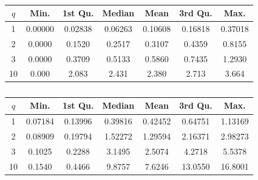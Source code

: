 \documentclass[preprint,5p,times,twocolumn,authoryear]{elsarticle}
\begin{document}



\begin{table}
	\caption{}
	\begin{tabular}{|ccccccc|}
    	$q$ & Min. & 1st Qu. & Median & Mean & 3rd Qu. & Max. \\\hline
        1 & 0.00000 & 0.02838 & 0.06263 & 0.10608 & 0.16818 & 0.37018 \\
        2 & 0.0000 & 0.1520 & 0.2517 & 0.3107 & 0.4359 & 0.8155 \\
        3 & 0.0000 & 0.3709 & 0.5133 & 0.5860 & 0.7435 & 1.2930 \\
        10 & 0.000 & 2.083 & 2.431 & 2.380 & 2.713 & 3.664 \\\hline
    \end{tabular}
\end{table}

\begin{table}
	\caption{}
	\begin{tabular}{|ccccccc|}
    	$q$ & Min. & 1st Qu. & Median & Mean & 3rd Qu. & Max. \\\hline
        1 & 0.07184 & 0.13996 & 0.39816 & 0.42452 & 0.64751 & 1.13169\\
        2 & 0.08909 & 0.19794 & 1.52272 & 1.29594 & 2.16371 & 2.98273\\
        3 & 0.1025 & 0.2288 & 3.1495 & 2.5074 & 4.2718 & 5.5378\\
        10 & 0.1540 & 0.4466 & 9.8757 & 7.6246 & 13.0550 & 16.8001\\\hline
    \end{tabular}
\end{table}





\section{}
\label{app:code}
\end{document}
